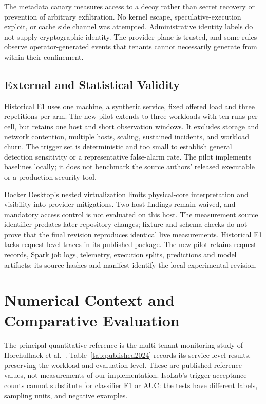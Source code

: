 \documentclass[conference,letterpaper]{IEEEtran}
\begin{document}
The metadata canary measures access to a decoy rather than secret recovery or prevention of arbitrary exfiltration. No kernel escape, speculative-execution exploit, or cache side channel was attempted. Administrative identity labels do not supply cryptographic identity. The provider plane is trusted, and some rules observe operator-generated events that tenants cannot necessarily generate from within their confinement.

\subsection{External and Statistical Validity}
Historical E1 uses one machine, a synthetic service, fixed offered load and three repetitions per arm. The new pilot extends to three workloads with ten runs per cell, but retains one host and short observation windows. It excludes storage and network contention, multiple hosts, scaling, sustained incidents, and workload churn. The trigger set is deterministic and too small to establish general detection sensitivity or a representative false-alarm rate. The pilot implements baselines locally; it does not benchmark the source authors' released executable or a production security tool.

Docker Desktop's nested virtualization limits physical-core interpretation and visibility into provider mitigations. Two host findings remain waived, and mandatory access control is not evaluated on this host. The measurement source identifier predates later repository changes; fixture and schema checks do not prove that the final revision reproduces identical live measurements. Historical E1 lacks request-level traces in its published package. The new pilot retains request records, Spark job logs, telemetry, execution splits, predictions and model artifacts; its source hashes and manifest identify the local experimental revision.


\section{Numerical Context and Comparative Evaluation}
\label{sec:comparison}
The principal quantitative reference is the multi-tenant monitoring study
of Horchulhack et al.~\cite{qos2024}. Table~\ref{tab:published2024} records
its service-level results, preserving the workload and evaluation level.
These are published reference values, not measurements of our implementation.
IsoLab's trigger acceptance counts cannot substitute for classifier F1 or AUC:
the tests have different labels, sampling units, and negative examples.
\end{document}
